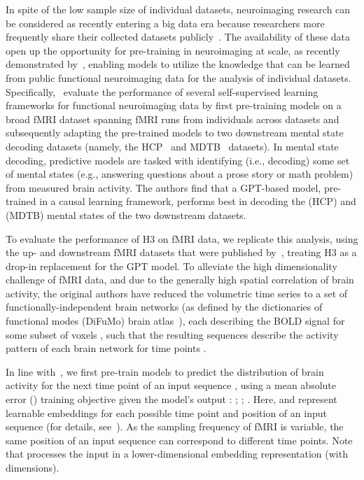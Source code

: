 \documentclass{article}
\begin{document}
In spite of the low sample size of individual datasets, neuroimaging research can be considered as recently entering a big data era because researchers more frequently share their collected datasets publicly~\citep{markiewicz_2021_openneuro}. The availability of these data open up the opportunity for pre-training in neuroimaging at scale, as recently demonstrated by~\citep{thomas_fmri_2022}, enabling models to utilize the knowledge that can be learned from public functional neuroimaging data for the analysis of individual datasets. Specifically,~\citep{thomas_fmri_2022} evaluate the performance of several self-supervised learning frameworks for functional neuroimaging data by first pre-training models on a broad fMRI dataset spanning  fMRI runs from  individuals across  datasets and subsequently adapting the pre-trained models to two downstream mental state decoding datasets (namely, the HCP~\citep{van_2013_wu} and MDTB~\citep{king_2019_functional} datasets). In mental state decoding, predictive models are tasked with identifying (i.e., decoding) some set of mental states (e.g., answering questions about a prose story or math problem) from measured brain activity. The authors find that a GPT-based model, pre-trained in a causal learning framework, performs best in decoding the  (HCP) and  (MDTB) mental states of the two downstream datasets.

To evaluate the performance of H3 on fMRI data, we replicate this analysis, using the up- and downstream fMRI datasets that were published by~\citep{thomas_fmri_2022}, treating H3 as a drop-in replacement for the GPT model. To alleviate the high dimensionality challenge of fMRI data, and due to the generally high spatial correlation of brain activity, the original authors have reduced the volumetric time series  to a set  of  functionally-independent brain networks   (as defined by the dictionaries of functional modes (DiFuMo) brain atlas~\citep{dadi_2020_fine}), each describing the BOLD signal for some subset of voxels , such that the resulting sequences  describe the activity pattern of each brain network  for time points . 

In line with~\citep{thomas_fmri_2022}, we first pre-train models  to predict the distribution of brain activity for the next time point  of an input sequence , using a mean absolute error () training objective given the model's output : ; ; . Here,  and  represent learnable embeddings for each possible time point and position of an input sequence (for details, see~\citep{thomas_fmri_2022}). As the sampling frequency of fMRI is variable, the same position of an input sequence can correspond to different time points. Note that  processes the input in a lower-dimensional embedding representation  (with  dimensions).
\end{document}
